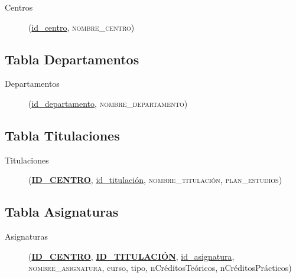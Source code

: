       \begin{description}
         \item[Centros] \begin{flushleft}(\underline{id\_centro},
         \textsc{nombre\_centro})\end{flushleft}
      \end{description}

   \subsection{Tabla Departamentos}

      \begin{description}
         \item[Departamentos] \begin{flushleft}(\underline{id\_departamento},
         \textsc{nombre\_departamento})\end{flushleft}
      \end{description}

   \subsection{Tabla Titulaciones}

      \begin{description}
         \item[Titulaciones] \begin{flushleft}(\underline{\textbf{ID\_CENTRO}},
         \underline{id\_titulación}, \textsc{nombre\_titulación},
         \textsc{plan\_estudios})\end{flushleft}
      \end{description}

   \subsection{Tabla Asignaturas}

      \begin{description}
         \item[Asignaturas] \begin{flushleft}(\underline{\textbf{ID\_CENTRO}},
         \underline{\textbf{ID\_TITULACIÓN}}, \underline{id\_asignatura},
         \textsc{nombre\_asignatura}, curso, tipo, nCréditosTeóricos,
         nCréditosPrácticos)\end{flushleft}
      \end{description}